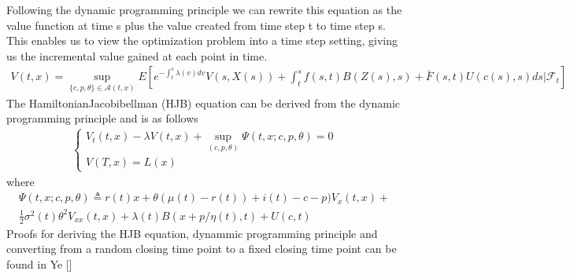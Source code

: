 \documentclass[letterpaper,10pt,english]{jupyterBook}
\begin{document}
\sphinxAtStartPar
Following the dynamic programming principle we can rewrite this equation as the value function at time s plus the value created from time step t to time step s. This enables us to view the optimization problem into a time step setting, giving us the incremental value gained at each point in time.
\begin{equation*}
\begin{split} V(t,x) = \sup_{\{c,p,\theta\} \in \mathcal{A}(t,x)} E\left[e^{-\int_t^s\lambda(v)dv}V(s,X(s)) + \int_t^s f(s,t)B(Z(s),s) + \bar{F}(s,t)U(c(s),s)ds|\mathcal{F}_t\right] \end{split}
\end{equation*}
\sphinxAtStartPar
The Hamiltonian\sphinxhyphen{}Jacobi\sphinxhyphen{}bellman (HJB) equation can be derived from the dynamic programming principle and is as follows
\begin{gather*}
\begin{cases} 
V_t(t,x) -\lambda V(t,x) + \sup_{(c,p,\theta)} \Psi(t,x;c,p,\theta)  = 0 \\ V(T,x) = L(x)  
\end{cases}
\end{gather*}
\sphinxAtStartPar
where
\begin{equation*}
\begin{split} \Psi(t,x; c,p,\theta) \triangleq r(t)x + \theta(\mu(t) -r(t)) + i(t) -c -p)V_x(t,x) + \\ \frac{1}{2}\sigma^2(t)\theta^2V_{xx}(t,x) + \lambda(t)B(x+ p/\eta(t),t) + U(c,t) \end{split}
\end{equation*}
\sphinxAtStartPar
Proofs for deriving the HJB equation, dynammic programming principle and converting from a random closing time point to a fixed closing time point can be found in Ye {[}{]}
\end{document}

